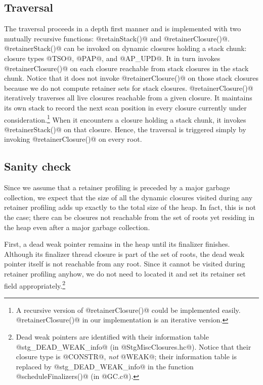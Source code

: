 \documentclass{article}
\begin{document}
\subsection{Traversal}

The traversal proceeds in a depth first manner and is implemented
with two mutually recursive functions: @retainStack()@ and @retainerClosure()@.
@retainerStack()@ can be invoked on dynamic closures holding a stack chunk:
closure types @TSO@, @PAP@, and @AP_UPD@. 
It in turn invokes @retainerClosure()@ on each closure reachable from
stack closures in the stack chunk. Notice that it does not invoke
@retainerClosure()@ on those stack closures because we do not compute 
retainer sets for stack closures.
@retainerClosure()@ iteratively traverses all live closures reachable
from a given closure.
It maintains its own stack to record the next scan position in every closure
currently under consideration.\footnote{A recursive version of 
@retainerClosure()@ could be implemented easily. 
@retainerClosure()@ in our implementation is an iterative version.}
When it encounters a closure holding a stack chunk, it invokes @retainerStack()@
on that closure. 
Hence,
the traversal is triggered simply by invoking @retainerClosure()@ on every root.

\subsection{Sanity check}

Since we assume that a retainer profiling is preceded by a major garbage
collection,
we expect that the size of all the dynamic closures visited during 
any retainer profiling adds up exactly to the total size of the heap.
In fact, this is not the case; there can be closures not reachable from
the set of roots yet residing in the heap even after a major garbage
collection.

First, a dead weak pointer remains in the heap until its finalizer
finishes. Although its finalizer thread closure is part of the set of roots,
the dead weak pointer itself is not reachable from any root.
Since it cannot be visited during retainer profiling anyhow, we do not
need to located it and set its retainer set field 
appropriately.\footnote{Dead weak pointers are identified with their 
information table @stg\_DEAD\_WEAK\_info@ (in @StgMiscClosures.hc@). 
Notice that their closure type is @CONSTR@, \emph{not} @WEAK@;
their information table is replaced by @stg\_DEAD\_WEAK\_info@ in the 
function @scheduleFinalizers()@ (in @GC.c@).} 
\end{document}
